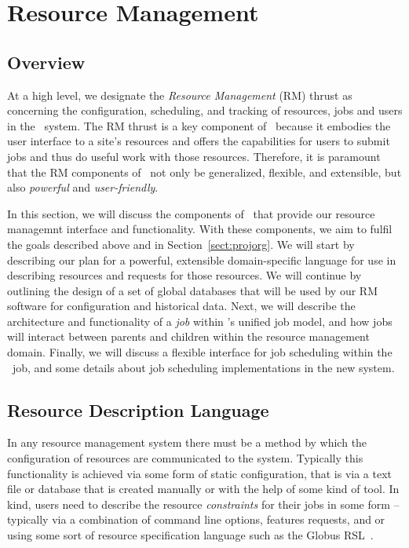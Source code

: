 \section{Resource Management}
\label{sec:resmgmt}

\subsection{Overview}

At a high level, we designate the \emph{Resource Management} (RM)
thrust as concerning the configuration, scheduling, and
tracking of resources, jobs and users in the \ngrm\ system. The
RM  thrust is a key component of \ngrm\ because it embodies the
user interface to a site's resources and offers the capabilities
for users to submit jobs and thus do useful work with those
resources. Therefore, it is paramount that the RM components of
\ngrm\ not only be generalized, flexible, and extensible, but
also \emph{powerful} and \emph{user-friendly}.

In this section, we will discuss the
components of \ngrm\ that provide our resource managemnt
interface and functionality. With these components, we
aim to fulfil the  goals described above and in
Section~\ref{sect:projorg}. We will start by describing our plan
for a powerful, extensible domain-specific language for use in
describing resources and requests for those resources. We will
continue by outlining the design of a set of global databases that
will be used by our RM software for configuration and historical
data. Next, we will describe the architecture and functionality
of a \emph{job} within \ngrm's unified job model, and how jobs
will interact between parents and children within the resource
management domain. Finally, we will discuss a flexible interface
for job scheduling within the \ngrm\ job, and some details about
job scheduling implementations in the new system.

\subsection{Resource Description Language}

In any resource management system there must be a method by
which the configuration of resources are communicated to the
system. Typically this functionality is achieved via some form
of static configuration, that is via a text file or database
that is created manually or with the help of some kind of
tool. In kind, users need to describe the resource \emph{constraints}
for their jobs in some form -- typically via a combination
of command line options, features requests, and or using
some sort of resource specification language such as the
Globus RSL~\cite{GlobusRSL}.


